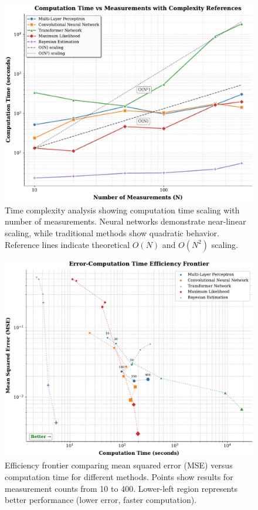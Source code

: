 \documentclass{optica-article}
\begin{document}
\begin{figure}[H]
\centering
\includegraphics[width=\linewidth]{../plots/time_vs_measurements_with_complexity.pdf}
\caption{Time complexity analysis showing computation time scaling with number of measurements. Neural networks demonstrate near-linear scaling, while traditional methods show quadratic behavior. Reference lines indicate theoretical $O(N)$ and $O(N^2)$ scaling.}
\label{fig:time_complexity}
\end{figure}

\begin{figure}[H]
\centering
\includegraphics[width=\linewidth]{../plots/error_vs_time_efficiency.pdf}
\caption{Efficiency frontier comparing mean squared error (MSE) versus computation time for different methods. Points show results for measurement counts from 10 to 400. Lower-left region represents better performance (lower error, faster computation).}
\label{fig:efficiency}
\end{figure}
\end{document}
